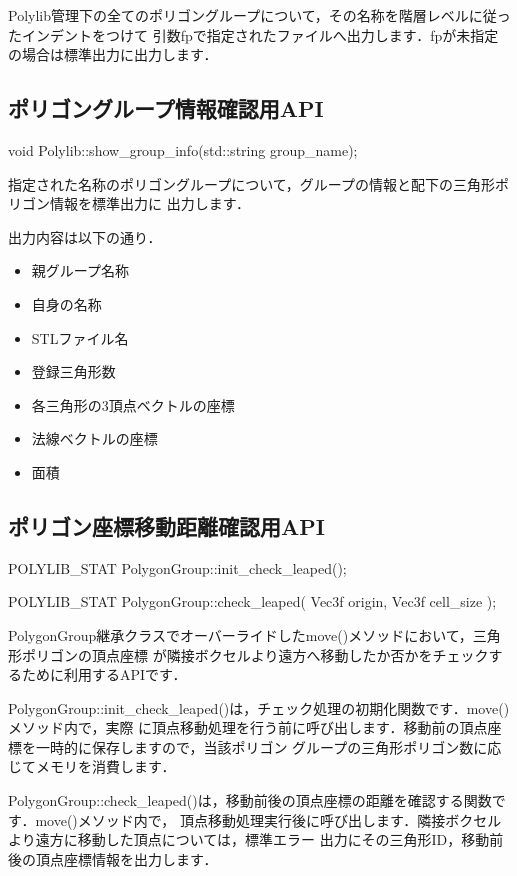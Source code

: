 {Polylib管理下の全てのポリゴングループについて，その名称を階層レベルに従ったインデントをつけて
引数fpで指定されたファイルへ出力します．fpが未指定の場合は標準出力に出力します．

%
\subsection{ポリゴングループ情報確認用API}

\begin{program}
	void Polylib::show_group_info(std::string group_name);
\end{program}

指定された名称のポリゴングループについて，グループの情報と配下の三角形ポリゴン情報を標準出力に
出力します．

出力内容は以下の通り．

\begin{itemize}
 \item 親グループ名称
 \item 自身の名称
 \item STLファイル名
 \item 登録三角形数
 \item 各三角形の3頂点ベクトルの座標
 \item 法線ベクトルの座標
 \item 面積
\end{itemize}

%
\subsection{ポリゴン座標移動距離確認用API}

\begin{program}
	POLYLIB_STAT PolygonGroup::init_check_leaped();

	POLYLIB_STAT PolygonGroup::check_leaped(
		Vec3f	origin,
		Vec3f	cell_size
	);
\end{program}

PolygonGroup継承クラスでオーバーライドしたmove()メソッドにおいて，三角形ポリゴンの頂点座標
が隣接ボクセルより遠方へ移動したか否かをチェックするために利用するAPIです．

PolygonGroup::init\_check\_leaped()は，チェック処理の初期化関数です．move()メソッド内で，実際
に頂点移動処理を行う前に呼び出します．移動前の頂点座標を一時的に保存しますので，当該ポリゴン
グループの三角形ポリゴン数に応じてメモリを消費します．

PolygonGroup::check\_leaped()は，移動前後の頂点座標の距離を確認する関数です．move()メソッド内で，
頂点移動処理実行後に呼び出します．隣接ボクセルより遠方に移動した頂点については，標準エラー
出力にその三角形ID，移動前後の頂点座標情報を出力します．

}
